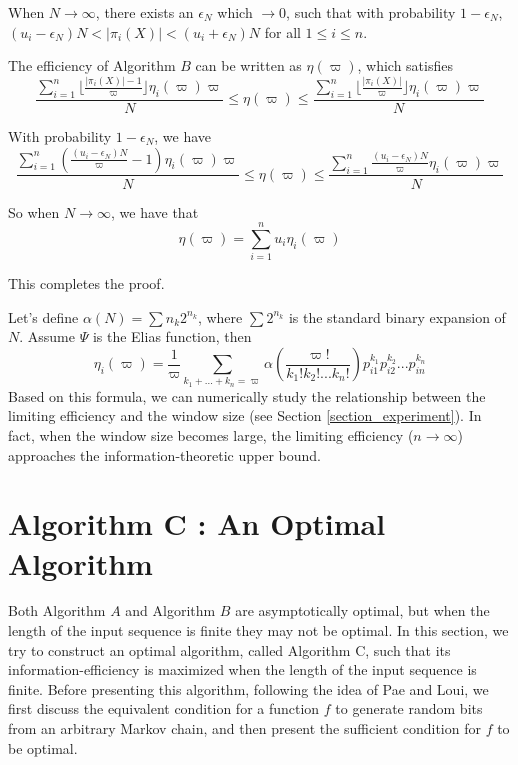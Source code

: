 \documentclass[journal]{IEEEtran}
\begin{document}
\proof  When $N\rightarrow \infty$, there exists an $\epsilon_N$ which $\rightarrow 0$, such that
with probability $1-\epsilon_N$, $(u_i-\epsilon_N)N<|\pi_i(X)|<(u_i+\epsilon_N)N$ for all $1\leq i\leq n$.

The efficiency of Algorithm $B$ can be written as $\eta(\varpi)$, which satisfies
$$\frac{\sum_{i=1}^{n} \lfloor\frac{|\pi_i(X)|-1}{\varpi}\rfloor \eta_i(\varpi)\varpi}{N}\leq \eta(\varpi)\leq \frac{\sum_{i=1}^{n} \lfloor\frac{|\pi_i(X)|}{\varpi}\rfloor \eta_i(\varpi)\varpi}{N}$$

With probability $1-\epsilon_N$, we have
{\small $$\frac{\sum_{i=1}^{n} (\frac{(u_i-\epsilon_N)N}{\varpi}-1) \eta_i(\varpi)\varpi}{N}\leq \eta(\varpi) \leq \frac{\sum_{i=1}^{n}\frac{ (u_i-\epsilon_N)N}{\varpi} \eta_i(\varpi)\varpi}{N}$$}

So when $N\rightarrow \infty$, we have that
$$\eta(\varpi)=\sum_{i=1}^{n} u_i\eta_{i}(\varpi)$$

This completes the proof.
\hfill\QED

Let's define $\alpha(N)=\sum n_k 2^{n_k}$, where $\sum 2^{n_k}$ is the standard binary expansion of $N$. Assume $\Psi$ is the Elias function, then
$$\eta_i(\varpi)=\frac{1}{\varpi}\sum_{k_1+...+k_n=\varpi}\alpha(\frac{\varpi!}{k_1!k_2!...k_n!})p_{i1}^{k_1}p_{i2}^{k_2}...p_{in}^{k_n}$$
Based on this formula, we can numerically study the relationship between the limiting efficiency and the window size  (see Section \ref{section_experiment}). In fact, when the window size becomes large, the limiting efficiency ($n\rightarrow\infty$) approaches the information-theoretic upper bound.

\section{Algorithm C : An Optimal Algorithm}
\label{section_optimal}

Both Algorithm $A$ and Algorithm $B$ are asymptotically optimal, but when the length of the input sequence is finite they may not be optimal.
In this section, we try to construct an optimal algorithm, called Algorithm C, such that its information-efficiency is maximized when the length of the input sequence is finite. Before presenting this algorithm, following the idea of Pae and Loui\cite{Pae2005}, we first discuss the equivalent condition for a function $f$ to generate random bits from an arbitrary Markov chain, and then
present the sufficient condition for $f$ to be optimal.
\end{document}
